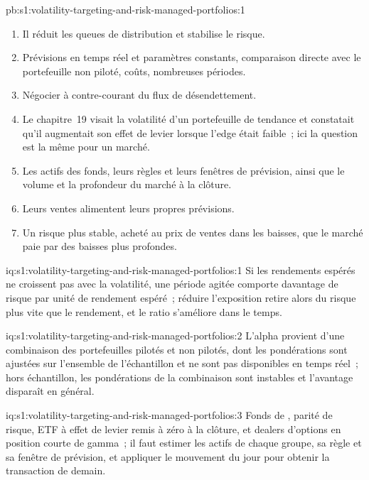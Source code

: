 \begin{solution}{pb:s1:volatility-targeting-and-risk-managed-portfolios:1}
\begin{enumerate}
\item Il réduit les queues de distribution et stabilise le risque.
\item Prévisions en temps réel et paramètres constants, comparaison directe avec le portefeuille non piloté, coûts, nombreuses périodes.
\item Négocier à contre-courant du flux de désendettement.
\item Le chapitre~19 visait la volatilité d'un portefeuille de tendance et constatait qu'il augmentait son effet de levier lorsque l'edge était faible~; ici la question est la même pour un marché.
\item Les actifs des fonds, leurs règles et leurs fenêtres de prévision, ainsi que le volume et la profondeur du marché à la clôture.
\item Leurs ventes alimentent leurs propres prévisions.
\item Un risque plus stable, acheté au prix de ventes dans les baisses, que le marché paie par des baisses plus profondes.
\end{enumerate}
\end{solution}

\begin{solution}{iq:s1:volatility-targeting-and-risk-managed-portfolios:1}
Si les rendements espérés ne croissent pas avec la volatilité, une période agitée comporte davantage de risque par unité de rendement espéré~; réduire l'exposition retire alors du risque
plus vite que le rendement, et le ratio s'améliore dans le temps.
\end{solution}

\begin{solution}{iq:s1:volatility-targeting-and-risk-managed-portfolios:2}
L'alpha provient d'une combinaison des portefeuilles pilotés et non pilotés, dont les pondérations sont ajustées sur l'ensemble de l'échantillon et ne sont pas disponibles en temps réel~;
hors échantillon, les pondérations de la combinaison sont instables et l'avantage disparaît en général.
\end{solution}

\begin{solution}{iq:s1:volatility-targeting-and-risk-managed-portfolios:3}
Fonds de , parité de risque, ETF à effet de levier remis à zéro à la clôture, et dealers d'options en position courte de gamma~; il faut estimer
les actifs de chaque groupe, sa règle et sa fenêtre de prévision, et appliquer le mouvement du jour pour obtenir la transaction de demain.
\end{solution}

